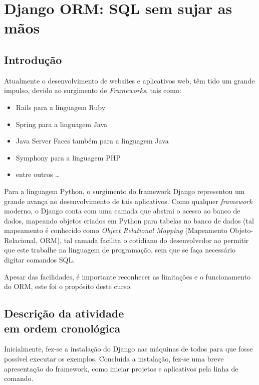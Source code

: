\documentclass[a4paper]{report}
\begin{document}
    \chapter[Django ORM]{Django ORM: SQL sem sujar as mãos}

        \section{Introdução}
        Atualmente o desenvolvimento de websites e aplicativos web, têm tido um
        grande impulso, devido ao surgimento de \emph{Frameworks}, tais como:

        \begin{itemize}

            \item Rails para a linguagem Ruby

            \item Spring para a linguagem Java

            \item Java Server Faces também para a linguagem Java

            \item Symphony para a linguagem PHP

            \item entre outros \ldots

        \end{itemize}

        Para a linguagem Python, o surgimento do framework Django representou
        um grande avança no desenvolvimento de tais aplicativos. Como qualquer
        \emph{framework} moderno, o Django conta com uma camada que abstrai o
        acesso ao banco de dados, mapeando objetos criados em Python para
        tabelas no banco de dados (tal mapeamento é conhecido como \emph{Object
        Relational Mapping} (Mapeamento Objeto-Relacional, ORM), tal camada
        facilita o cotidiano do desenvolvedor ao permitir que este trabalhe na
        linguagem de programação, sem que se faça necessário digitar comandos
        SQL.

        Apesar das facilidades, é importante reconhecer as limitações e o
        funcionamento do ORM, este foi o propósito deste curso.

        \section[Descrição atividade]{Descrição da atividade
        \\em ordem cronológica}
        Inicialmente, fez-se a instalação do Django nas máquinas de todos
        para que fosse possível executar os exemplos. Concluída a instalação,
        fez-se uma breve apresentação do framework, como iniciar projetos e
        aplicativos pela linha de comando.
\end{document}
